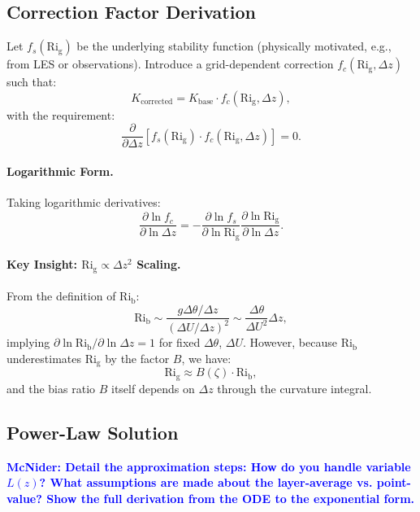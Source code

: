 \documentclass[twocolumn,11pt]{article}
\newcommand{\Rig}{\text{Ri}_{\text{g}}}
\newcommand{\Rib}{\text{Ri}_{\text{b}}}
\newcommand{\MCNIDER}[1]{\textcolor{blue}{\textbf{McNider: #1}}}
\begin{document}
\subsection{Correction Factor Derivation}

Let $f_s(\Rig)$ be the underlying stability function (physically motivated, e.g., from LES or observations). Introduce a grid-dependent correction $f_c(\Rig, \Delta z)$ such that:
\begin{equation}
K_{\text{corrected}} = K_{\text{base}} \cdot f_c(\Rig, \Delta z),
\end{equation}
with the requirement:
\begin{equation}
\frac{\partial}{\partial \Delta z}\left[f_s(\Rig) \cdot f_c(\Rig, \Delta z)\right] = 0.
\label{eq:invariance_ode}
\end{equation}

\paragraph{Logarithmic Form.} Taking logarithmic derivatives:
\begin{equation}
\frac{\partial \ln f_c}{\partial \ln \Delta z} = -\frac{\partial \ln f_s}{\partial \ln \Rig}\frac{\partial \ln \Rig}{\partial \ln \Delta z}.
\end{equation}

\paragraph{Key Insight: $\Rig \propto \Delta z^2$ Scaling.} From the definition of $\Rib$:
\begin{equation}
\Rib \sim \frac{g \Delta \theta / \Delta z}{(\Delta U / \Delta z)^2} \sim \frac{\Delta \theta}{\Delta U^2}\Delta z,
\end{equation}
implying $\partial \ln \Rib / \partial \ln \Delta z = 1$ for fixed $\Delta \theta$, $\Delta U$. However, because $\Rib$ underestimates $\Rig$ by the factor $B$, we have:
\begin{equation}
\Rig \approx B(\zeta) \cdot \Rib,
\end{equation}
and the bias ratio $B$ itself depends on $\Delta z$ through the curvature integral.

\subsection{Power-Law Solution}

\MCNIDER{Detail the approximation steps: How do you handle variable $L(z)$? What assumptions are made about the layer-average vs. point-value? Show the full derivation from the ODE to the exponential form.}
\end{document}
